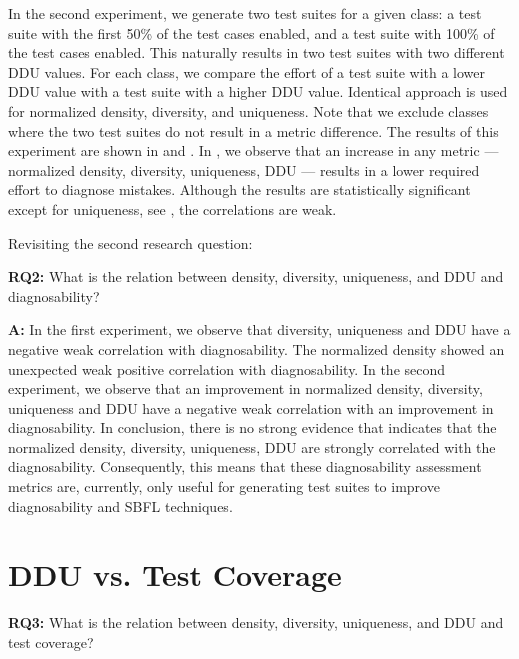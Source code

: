 \documentclass[twoside,a4paper,11pt]{memoir}
\begin{document}
In the second experiment, we generate two test suites for a given class: a test suite with the first 50\% of the test cases enabled, and a test suite with 100\% of the test cases enabled.
This naturally results in two test suites with two different DDU values.
For each class, we compare the effort of a test suite with a lower DDU value with a test suite with a higher DDU value.
Identical approach is used for normalized density, diversity, and uniqueness.
Note that we exclude classes where the two test suites do not result in a metric difference.
The results of this experiment are shown in  and .
In , we observe that an increase in any metric --- normalized density, diversity, uniqueness, DDU --- results in a lower required effort to diagnose mistakes.
Although the results are statistically significant except for uniqueness, see , the correlations are weak.

Revisiting the second research question:
\begin{framed}
\noindent
\textbf{RQ2:} What is the relation between density, diversity, uniqueness, and DDU and diagnosability?
\end{framed}
\textbf{A:} In the first experiment, we observe that diversity, uniqueness and DDU have a negative weak correlation with diagnosability.
The normalized density showed an unexpected weak positive correlation with diagnosability.
In the second experiment, we observe that an improvement in normalized density, diversity, uniqueness and DDU have a negative weak correlation with an improvement in diagnosability.
In conclusion, there is no strong evidence that indicates that the normalized density, diversity, uniqueness, DDU are strongly correlated with the diagnosability.
Consequently, this means that these diagnosability assessment metrics are, currently, only useful for generating test suites to improve diagnosability and SBFL techniques.

\chapter{DDU vs. Test Coverage}%
\label{ch:rq3}

\begin{framed}
\noindent
\textbf{RQ3:} What is the relation between density, diversity, uniqueness, and DDU and test coverage?
\end{framed}
\end{document}
